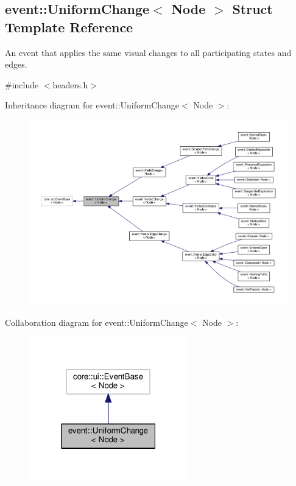 \hypertarget{structevent_1_1UniformChange}{}\subsection{event\+:\+:Uniform\+Change$<$ Node $>$ Struct Template Reference}
\label{structevent_1_1UniformChange}


An event that applies the same visual changes to all participating states and edges.  




{\ttfamily \#include $<$headers.\+h$>$}



Inheritance diagram for event\+:\+:Uniform\+Change$<$ Node $>$\+:\nopagebreak
\begin{figure}[H]
\begin{center}
\leavevmode
\includegraphics[width=350pt]{structevent_1_1UniformChange__inherit__graph}
\end{center}
\end{figure}


Collaboration diagram for event\+:\+:Uniform\+Change$<$ Node $>$\+:\nopagebreak
\begin{figure}[H]
\begin{center}
\leavevmode
\includegraphics[width=195pt]{structevent_1_1UniformChange__coll__graph}
\end{center}
\end{figure}
